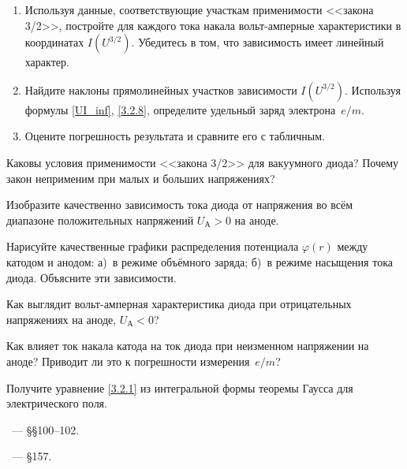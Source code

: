 \begin{lab:task}
\begin{enumerate}
\item Используя данные, соответствующие участкам применимости
<<закона 3/2>>, постройте для каждого тока накала вольт-амперные 
характеристики в координатах $I(U^{3/2})$. 
Убедитесь в том, что зависимость имеет линейный характер. 

\item Найдите наклоны прямолинейных участков зависимости
$I(U^{3/2})$. Используя формулы \eqref{UI_inf}, \eqref{3.2.8}, 
определите удельный заряд электрона~$e/m$.

\item Оцените погрешность результата и сравните его с табличным.

\end{enumerate}

\end{lab:task}

\begin{lab:questions}
    
    \item Каковы условия применимости <<закона 3/2>> для вакуумного диода?
    Почему закон неприменим при малых и больших напряжениях?
    
    \item Изобразите качественно зависимость тока диода от напряжения
    во всём диапазоне положительных напряжений $U_{А}>0$ на аноде.
    
	\item Нарисуйте качественные графики распределения потенциала $\varphi(r)$ 
    между катодом и анодом: а)~в режиме объёмного заряда;
б)~в режиме насыщения тока диода. Объясните эти зависимости.

    \item Как выглядит вольт-амперная характеристика диода при отрицательных
    напряжениях на аноде, $U_{А}<0$?

	\item Как влияет ток накала катода на ток диода при неизменном напряжении
на аноде? Приводит ли это к погрешности измерения~$e/m$?

    \item Получите уравнение \eqref{3.2.1} из интегральной формы теоремы Гаусса
    для электрического поля.

\end{lab:questions}

\begin{lab:literature}
	\item \SivuhinIII~--- \S\S100--102.
	\item \Kalashnikov~--- \S157.
\end{lab:literature}

